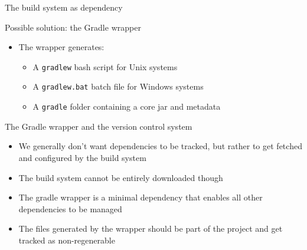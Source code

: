 \documentclass[presentation]{beamer}
\begin{document}
\begin{frame}{The build system as dependency}
\begin{block}{Possible solution: the Gradle wrapper}
\begin{itemize}
\begin{itemize}
                \item In case the version is unspecified, the currently installed Gradle version is used
            \end{itemize}
            \item The wrapper generates:
            \begin{itemize}
                \item A \texttt{gradlew} bash script for Unix systems
                \item A \texttt{gradlew.bat} batch file for Windows systems
                \item A \texttt{gradle} folder containing a core jar and metadata
            \end{itemize}
        \end{itemize}
    \end{block}
    \begin{block}{The Gradle wrapper and the version control system}
        \begin{itemize}
            \item We generally don't want dependencies to be tracked, but rather to get fetched and configured by the build system
            \item The build system cannot be entirely downloaded though
            \item The gradle wrapper is a minimal dependency that enables all other dependencies to be managed
            \item The files generated by the wrapper should be part of the project and get tracked as non-regenerable
        \end{itemize}
    \end{block}
\end{frame}
\end{document}
